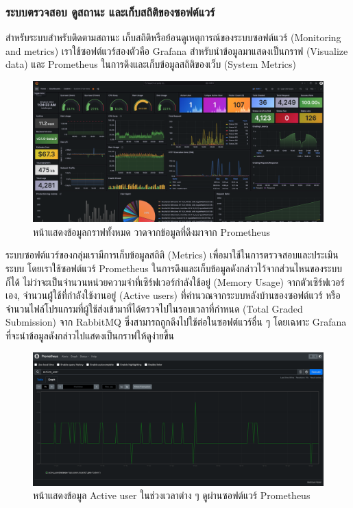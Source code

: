 \documentclass[12pt,one side,openright,a4paper]{cpe-thesis-th}
\newcommand{\thaijustify}[1]{%
  \par\hspace{30pt}\justifying
  #1
}
\begin{document}
        \subsubsection{ระบบตรวจสอบ ดูสถานะ และเก็บสถิติของซอฟต์แวร์}
            \thaijustify{
                สำหรับระบบสำหรับติดตามสถานะ เก็บสถิติหรือย้อนดูเหตุการณ์ของระบบซอฟต์แวร์ (Monitoring and metrics) เราใช้ซอฟต์แวร์สองตัวคือ Grafana สำหรับนำข้อมูลมาแสดงเป็นกราฟ (Visualize data) และ Prometheus ในการดึงและเก็บข้อมูลสถิติของเว็บ (System Metrics)
            }
            \begin{figure}[H]
                \centering
                \includegraphics[width=12cm]{figure/results/grafana.png}
                \caption[หน้าหลักของซอฟต์แวร์ Grafana]{หน้าแสดงข้อมูลกราฟทั้งหมด วาดจากข้อมูลที่ดึงมาจาก Prometheus}
                \label{fig:res-grafana}
            \end{figure}
            \thaijustify{
                ระบบซอฟต์แวร์ของกลุ่มเรามีการเก็บข้อมูลสถิติ (Metrics) เพื่อมาใช้ในการตรวจสอบและประเมินระบบ โดยเราใช้ซอฟต์แวร์ Prometheus ในการดึงและเก็บข้อมูลดังกล่าวไว้จากส่วนไหนของระบบก็ได้ ไม่ว่าจะเป็นจำนวนหน่วยความจำที่เซิร์ฟเวอร์กำลังใช้อยู่ (Memory Usage) จากตัวเซิร์ฟเวอร์เอง, จำนวนผู้่ใช้ที่กำลังใช้งานอยู่ (Active users) ที่คำนวณจากระบบหลังบ้านของซอฟต์แวร์ หรือจำนวนไฟล์โปรแกรมที่ผู้ใช้ส่งเข้ามาที่ได้ตรวจไปในรอบเวลาที่กำหนด (Total Graded Submission) จาก RabbitMQ ซึ่งสามารถถูกดึงไปใช้ต่อในซอฟต์แวร์อื่น ๆ โดยเฉพาะ Grafana ที่จะนำข้อมูลดังกล่าวไปแสดงเป็นกราฟให้ดูง่ายขึ้น
            }
            \begin{figure}[H]
                \centering
                \includegraphics[width=12cm]{figure/results/prometheus.png}
                \caption[หน้าแสดงข้อมูลของ Prometheus]{หน้าแสดงข้อมูล Active user ในช่วงเวลาต่าง ๆ ดูผ่านซอฟต์แวร์ Prometheus}
                \label{fig:res-prometheus}
            \end{figure}
\end{document}
